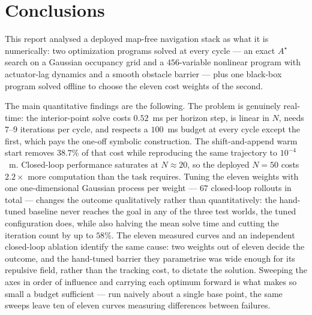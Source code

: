 \documentclass[11pt,a4paper]{article}
\newcommand{\astar}{$A^\star$}
\begin{document}
\section{Conclusions}
\label{sec:conclusions}

This report analysed a deployed map-free navigation stack as what it is numerically: two optimization programs
solved at every cycle --- an exact \astar{} search on a Gaussian occupancy grid and a $456$-variable
nonlinear program with actuator-lag dynamics and a smooth obstacle barrier --- plus one black-box program
solved offline to choose the eleven cost weights of the second.

The main quantitative findings are the following. The problem is genuinely real-time: the interior-point solve
costs $0.52$~ms per horizon step, is linear in $N$, needs $7$--$9$ iterations per cycle, and respects a
$100$~ms budget at every cycle except the first, which pays the one-off symbolic construction. The
shift-and-append warm start removes $38.7\%$ of that cost while reproducing the same trajectory to
$10^{-4}$~m. Closed-loop performance saturates at $N\approx20$, so the deployed $N=50$ costs $2.2\times$ more
computation than the task requires. Tuning the eleven weights with one one-dimensional Gaussian process per
weight --- $67$ closed-loop rollouts in total --- changes the outcome qualitatively rather than
quantitatively: the hand-tuned baseline never reaches the goal in any of the three test worlds, the tuned
configuration does, while also halving the mean solve time and cutting the iteration count by up to $58\%$.
The eleven measured curves and an independent closed-loop ablation identify the same cause: two weights out
of eleven decide the outcome, and the hand-tuned barrier they parametrise was wide enough for its repulsive
field, rather than the tracking cost, to dictate the solution. Sweeping the axes in order of influence and
carrying each optimum forward is what makes so small a budget sufficient --- run naively about a single base
point, the same sweeps leave ten of eleven curves measuring differences between failures.
\end{document}
